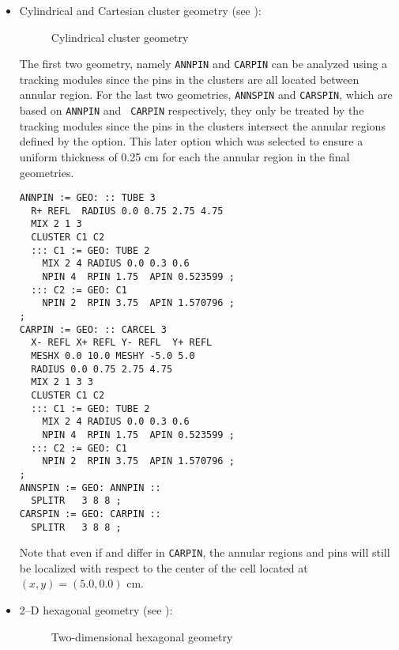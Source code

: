\begin{itemize}
\item Cylindrical and Cartesian cluster geometry (see ):

\begin{figure}[h!] 
\begin{center} 
\epsfxsize=10cm \centerline{ }
\parbox{14cm}{\caption{Cylindrical cluster geometry}\label{fig:grappe}}    
\end{center}  
\end{figure}

The first two geometry, namely {\tt ANNPIN} and {\tt CARPIN} can be analyzed
using a  tracking modules since the pins in
the clusters are all located between annular region. For the last two geometries,
{\tt ANNSPIN} and {\tt CARSPIN}, which are based on {\tt ANNPIN} and {\tt
CARPIN} respectively, they only be treated by the
 tracking modules since the pins in the clusters intersect the
annular regions defined by the  option. This later option which was
selected to ensure a uniform thickness of 0.25 cm for each the annular region in
the final geometries.

\begin{verbatim}
ANNPIN := GEO: :: TUBE 3
  R+ REFL  RADIUS 0.0 0.75 2.75 4.75
  MIX 2 1 3 
  CLUSTER C1 C2 
  ::: C1 := GEO: TUBE 2
    MIX 2 4 RADIUS 0.0 0.3 0.6
    NPIN 4  RPIN 1.75  APIN 0.523599 ;
  ::: C2 := GEO: C1
    NPIN 2  RPIN 3.75  APIN 1.570796 ;
;
CARPIN := GEO: :: CARCEL 3
  X- REFL X+ REFL Y- REFL  Y+ REFL
  MESHX 0.0 10.0 MESHY -5.0 5.0
  RADIUS 0.0 0.75 2.75 4.75
  MIX 2 1 3 3
  CLUSTER C1 C2 
  ::: C1 := GEO: TUBE 2
    MIX 2 4 RADIUS 0.0 0.3 0.6
    NPIN 4  RPIN 1.75  APIN 0.523599 ;
  ::: C2 := GEO: C1
    NPIN 2  RPIN 3.75  APIN 1.570796 ;
;
ANNSPIN := GEO: ANNPIN :: 
  SPLITR   3 8 8 ;
CARSPIN := GEO: CARPIN :: 
  SPLITR   3 8 8 ;
\end{verbatim}

Note that even if  and  differ in {\tt CARPIN}, the
annular regions and pins will still be localized with respect to the center of
the cell located at $(x,y)=(5.0,0.0)$ cm.


\item 2--D hexagonal geometry (see ):

\begin{figure}[h!] 
\begin{center} 
\epsfxsize=10cm \centerline{ }
\parbox{14cm}{\caption{Two-dimensional hexagonal geometry}
\label{fig:hexcel}}    
\end{center}  
\end{figure}


\end{itemize}
